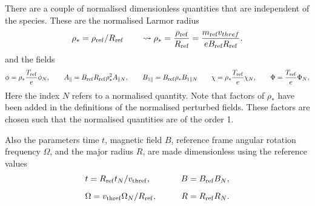 There are a couple of normalised dimensionless quantities that are independent of the species. These are the
normalised Larmor radius
\begin{equation} 
\rho_* = \rho_{\rm ref} / R_{\rm ref} \qquad \leadsto  \rho_* = \frac{\rho_{\text{ref}} }{R_{\text{ref}} } = \frac{m_{\text{ref}} v_{thref}}{eB_{\text{ref}} R_{\text{ref}} } .
\label{eq:normalise-rho}
\end{equation}
and the fields 
\begin{align} 
\phi = \rho_* {T_{\rm ref} \over e} \phi_N ,
\qquad 
A_\parallel = B_{\rm ref} R_{\rm ref} \rho_*^2 A_{\parallel N} ,
\qquad 
B_{1\parallel} = B_{\rm ref} \rho_* B_{1\parallel N}
\qquad
\chi = \rho_* {T_{\rm ref} \over e} \chi_N ,
\qquad
\Phi = {T_{\rm ref} \over e} \Phi_N ,
\label{eq:phi-norm}
\end{align} 
Here the index $N$ refers to a normalised quantity. 
Note that factors of $\rho_*$ have been added in the definitions of the normalised perturbed fields. 
These factors are chosen such that the normalised quantities are of the order 1. 

Also the parameters time $t$, magnetic field $B$, reference frame angular rotation frequency $\Omega$, and the major radius $R$, are made dimensionless using the reference values 
\begin{align}
&t = { R_{\rm ref} } t_N / v_{\rm thref} , \qquad &B = B_{\rm ref} B_N , \cr 
\noalign{\vskip 0.2 truecm} 
&\Omega = {v_{\rm thref} } \Omega_N / R_{\rm ref},  \qquad &R = R_{\rm ref} R_N .
\label{eq:normalise-parameters}
\end{align}

